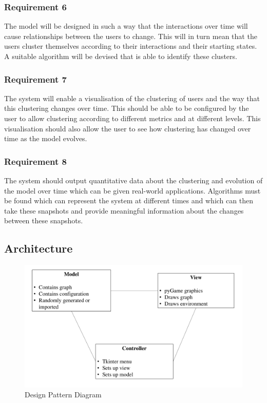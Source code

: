 \documentclass[12pt,a4paper]{article}
\begin{document}
\subsubsection{Requirement 6}
The model will be designed in such a way that the interactions over time will cause relationships between the users to change. This will in turn mean that the users cluster themselves according to their interactions and their starting states. A suitable algorithm will be devised that is able to identify these clusters.

\subsubsection{Requirement 7}
The system will enable a visualisation of the clustering of users and the way that this clustering changes over time. This should be able to be configured by the user to allow clustering according to different metrics and at different levels. This visualisation should also allow the user to see how clustering has changed over time as the model evolves.

\subsubsection{Requirement 8}
The system should output quantitative data about the clustering and evolution of the model over time which can be given real-world applications. Algorithms must be found which can represent the system at different times and which can then take these snapshots and provide meaningful information about the changes between these snapshots.

\subsection{Architecture}

\begin{figure}[htb]
\begin{center}
\caption{Design Pattern Diagram}
\label{fig:pattern}
\includegraphics[width=6in]{MVC}
\end{center}
\end{figure}
\end{document}
